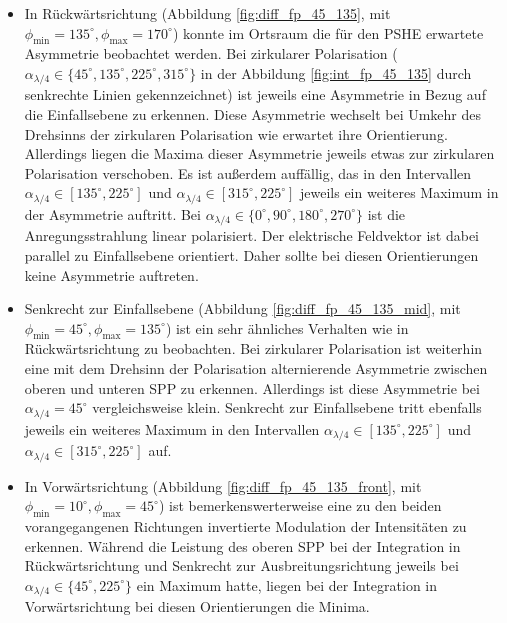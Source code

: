 \documentclass[titlepage,  ngerman]{article}
\begin{document}
			\begin{itemize}
				\item In Rückwärtsrichtung (Abbildung \ref{fig:diff_fp_45_135},  mit $\phi_\mathrm{min} =135^\circ, \phi_\mathrm{max}=170^\circ$) konnte im Ortsraum die für den PSHE erwartete Asymmetrie beobachtet werden. Bei zirkularer Polarisation ($\alpha_{\lambda/4} \in \{45^\circ, 135^\circ, 225^\circ, 315^\circ\}$ in der Abbildung \ref{fig:int_fp_45_135} durch senkrechte Linien gekennzeichnet) ist jeweils eine Asymmetrie in Bezug auf die Einfallsebene zu erkennen. Diese Asymmetrie wechselt bei Umkehr des Drehsinns der zirkularen Polarisation wie erwartet ihre Orientierung. Allerdings liegen die Maxima dieser Asymmetrie jeweils etwas zur zirkularen Polarisation verschoben. Es ist außerdem auffällig, das in den Intervallen $\alpha_{\lambda/4} \in [135^\circ,225^\circ]$ und $\alpha_{\lambda/4} \in [315^\circ, 225^\circ]$ jeweils ein weiteres Maximum in der Asymmetrie auftritt. Bei $\alpha_{\lambda/4} \in \{0^\circ, 90^\circ, 180^\circ, 270^\circ\}$ ist die Anregungsstrahlung linear polarisiert. Der elektrische Feldvektor ist dabei parallel zu Einfallsebene orientiert. Daher sollte bei diesen Orientierungen keine Asymmetrie auftreten.
				\item Senkrecht zur Einfallsebene (Abbildung \ref{fig:diff_fp_45_135_mid},  mit $\phi_\mathrm{min} =45^\circ, \phi_\mathrm{max}=135^\circ$) ist ein sehr ähnliches Verhalten wie in Rückwärtsrichtung zu beobachten. Bei zirkularer Polarisation ist weiterhin eine mit dem Drehsinn der Polarisation alternierende Asymmetrie zwischen oberen und unteren SPP zu erkennen. Allerdings ist diese Asymmetrie bei $\alpha_{\lambda/4}=45^\circ$ vergleichsweise klein. Senkrecht zur Einfallsebene tritt ebenfalls jeweils ein weiteres Maximum in den Intervallen $\alpha_{\lambda/4} \in [135^\circ,225^\circ]$ und $\alpha_{\lambda/4} \in [315^\circ, 225^\circ]$ auf.
				\item
				In Vorwärtsrichtung (Abbildung \ref{fig:diff_fp_45_135_front},  mit  $\phi_\mathrm{min} =10^\circ, \phi_\mathrm{max}=45^\circ$) ist bemerkenswerterweise eine zu den beiden vorangegangenen Richtungen invertierte Modulation der Intensitäten zu erkennen. Während die Leistung des oberen SPP bei der Integration in Rückwärtsrichtung und Senkrecht zur Ausbreitungsrichtung jeweils bei $\alpha_{\lambda /4} \in \{45^\circ, 225^\circ\}$ ein Maximum hatte, liegen bei der Integration in Vorwärtsrichtung bei diesen Orientierungen die Minima.
			\end{itemize}
\end{document}
